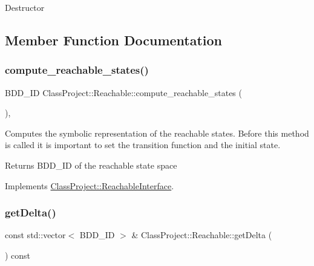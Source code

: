 Destructor 

\subsection{Member Function Documentation}
\mbox{\label{classClassProject_1_1Reachable_ab382d204af0fe91f027026b6dad6142f}} 
\subsubsection{\texorpdfstring{compute\+\_\+reachable\+\_\+states()}{compute\_reachable\_states()}}
{\footnotesize\ttfamily B\+D\+D\+\_\+\+ID Class\+Project\+::\+Reachable\+::compute\+\_\+reachable\+\_\+states (\begin{DoxyParamCaption}{ }\end{DoxyParamCaption})\hspace{0.3cm}{\ttfamily [override]}, {\ttfamily [virtual]}}

Computes the symbolic representation of the reachable states. Before this method is called it is important to set the transition function and the initial state. \begin{DoxyReturn}{Returns}
B\+D\+D\+\_\+\+ID of the reachable state space 
\end{DoxyReturn}


Implements \hyperlink{classClassProject_1_1ReachableInterface_a84a2fe53f724c184266fc22f17204499}{Class\+Project\+::\+Reachable\+Interface}.

\mbox{\label{classClassProject_1_1Reachable_a52a7381b5237c686f47496b8c63ac37f}} 
\subsubsection{\texorpdfstring{get\+Delta()}{getDelta()}}
{\footnotesize\ttfamily const std\+::vector$<$ B\+D\+D\+\_\+\+ID $>$ \& Class\+Project\+::\+Reachable\+::get\+Delta (\begin{DoxyParamCaption}{ }\end{DoxyParamCaption}) const}

